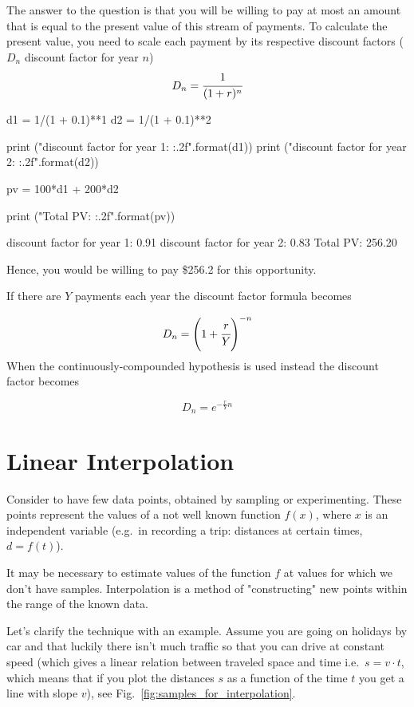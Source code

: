 The answer to the question is that you will be willing to pay at most an amount that is equal to the present value of this stream of payments. To calculate the present value, you need to scale each payment by its respective discount factors ($D_n$ discount factor for year $n$)
\begin{equation}
	D_n = \cfrac{1}{(1 + r)^n}
\end{equation}

\begin{ipython}
d1 = 1/(1 + 0.1)**1
d2 = 1/(1 + 0.1)**2

print ("discount factor for year 1: {:.2f}".format(d1))
print ("discount factor for year 2: {:.2f}".format(d2))

pv = 100*d1 + 200*d2

print ("Total PV: {:.2f}".format(pv))
\end{ipython}
\begin{ioutput}
discount factor for year 1: 0.91
discount factor for year 2: 0.83
Total PV: 256.20
\end{ioutput}
\noindent
Hence, you would be willing to pay \$256.2 for this opportunity.

If there are $Y$ payments each year the discount factor formula becomes

\begin{equation}
D_n = \left(1+\cfrac{r}{Y}\right)^{-n}
\end{equation}
\noindent
When the continuously-compounded hypothesis is used instead the discount factor becomes

\begin{equation}
D_n = e^{-\frac{r}{Y}n}
\end{equation}

\section{Linear Interpolation}
\label{linear-interpolation}

Consider to have few data points, obtained by sampling or experimenting. These points represent the values of a not well known function \(f(x)\), where \(x\) is an independent variable (e.g.~in recording a trip: distances at certain times, \(d = f(t)\)).

It may be necessary to estimate values of the function $f$ at values for which we don't have samples. Interpolation is a method of "constructing" new points within the range of the known data.

Let's clarify the technique with an example.
Assume you are going on holidays by car and that luckily there isn't much traffic so that you can drive at constant speed (which gives a linear relation between traveled space and time i.e.~\(s = v \cdot t\), which means that if you plot the distances \(s\) as a function of the time \(t\) you get a line with slope \(v\)), see Fig.~\ref{fig:samples_for_interpolation}.

